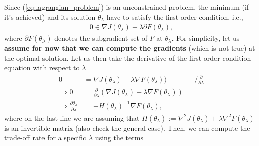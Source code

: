 \documentclass{article}
\begin{document}
 Since (\ref{eq:lagrangian_problem}) is an unconstrained problem, the minimum (if it's achieved) and its solution $\theta_{\lambda}$ have to satisfy the first-order condition, i.e.,
\begin{align*}
    0 \in \nabla J(\theta_{\lambda}) + \lambda \partial F(\theta_{\lambda}),
\end{align*}
where $\partial F(\theta_{\lambda})$ denotes the subgradient set of $F$ at $\theta_{\lambda}$. For simplicity, let us \textbf{assume for now that we can compute the gradients} {\color{red}(which is not true)} at the optimal solution. Let us then take the derivative of the first-order condition equation with respect to $\lambda$
\begin{align*}
 0 &= \nabla J(\theta_{\lambda}) + \lambda \nabla F(\theta_{\lambda})) && \Big/ \frac{\partial}{\partial \lambda}\\
    \Longrightarrow 0 &= \frac{\partial}{\partial \lambda} (\nabla J(\theta_{\lambda}) + \lambda \nabla F(\theta_{\lambda})) \\
   \Longrightarrow \frac{\partial\theta_{\lambda}}{\partial \lambda}&= - H(\theta_{\lambda})^{-1} \nabla F(\theta_{\lambda}), 
\end{align*}
where on the last line we are assuming that $H(\theta_{\lambda}) := \nabla^2 J(\theta_{\lambda}) + \lambda \nabla^2 F(\theta_{\lambda})$ is an invertible matrix {\color{red}(also check the general case)}.
Then, we can compute the trade-off rate for a specific $\lambda$ using the terms
\end{document}
